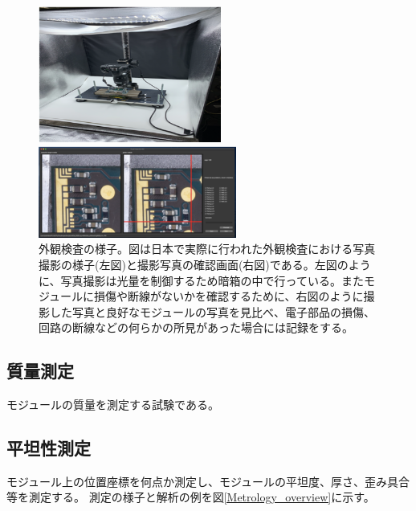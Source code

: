 \begin{figure}[bpt]\centering
  \begin{minipage}{0.4\hsize}
    \begin{center}
    \includegraphics[width=60mm]{VI_setup}
    \end{center}
  \end{minipage}
  \begin{minipage}{0.4\hsize}
    \begin{center}
    \includegraphics[width=65mm]{VI_analysis}
    \end{center}
  \end{minipage}
  \caption[外観検査の様子]{外観検査の様子。図は日本で実際に行われた外観検査における写真撮影の様子(左図)と撮影写真の確認画面(右図)である。左図のように、写真撮影は光量を制御するため暗箱の中で行っている。またモジュールに損傷や断線がないかを確認するために、右図のように撮影した写真と良好なモジュールの写真を見比べ、電子部品の損傷、回路の断線などの何らかの所見があった場合には記録をする。}
  \label{VI_overview}
\end{figure}

\subsection{質量測定}
モジュールの質量を測定する試験である。

\subsection{平坦性測定}
モジュール上の位置座標を何点か測定し、モジュールの平坦度、厚さ、歪み具合等を測定する。
測定の様子と解析の例を図\ref{Metrology_overview}に示す。

